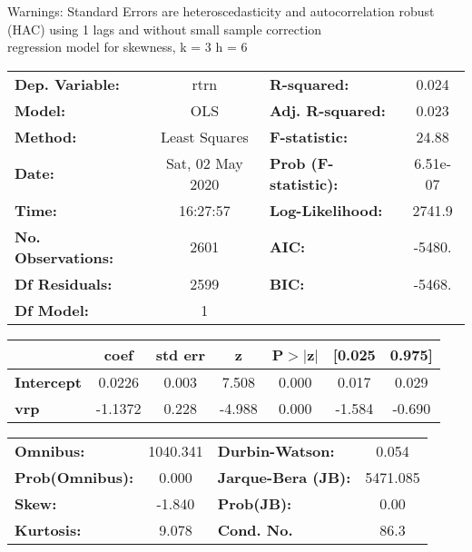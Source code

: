 Warnings: \newline
 [1] Standard Errors are heteroscedasticity and autocorrelation robust (HAC) using 1 lags and without small sample correction\\ 

regression model for skewness, k = 3 h = 6\begin{center}
\begin{tabular}{lclc}
\toprule
\textbf{Dep. Variable:}    &       rtrn       & \textbf{  R-squared:         } &     0.024   \\
\textbf{Model:}            &       OLS        & \textbf{  Adj. R-squared:    } &     0.023   \\
\textbf{Method:}           &  Least Squares   & \textbf{  F-statistic:       } &     24.88   \\
\textbf{Date:}             & Sat, 02 May 2020 & \textbf{  Prob (F-statistic):} &  6.51e-07   \\
\textbf{Time:}             &     16:27:57     & \textbf{  Log-Likelihood:    } &    2741.9   \\
\textbf{No. Observations:} &        2601      & \textbf{  AIC:               } &    -5480.   \\
\textbf{Df Residuals:}     &        2599      & \textbf{  BIC:               } &    -5468.   \\
\textbf{Df Model:}         &           1      & \textbf{                     } &             \\
\bottomrule
\end{tabular}
\begin{tabular}{lcccccc}
                   & \textbf{coef} & \textbf{std err} & \textbf{z} & \textbf{P$> |$z$|$} & \textbf{[0.025} & \textbf{0.975]}  \\
\midrule
\textbf{Intercept} &       0.0226  &        0.003     &     7.508  &         0.000        &        0.017    &        0.029     \\
\textbf{vrp}       &      -1.1372  &        0.228     &    -4.988  &         0.000        &       -1.584    &       -0.690     \\
\bottomrule
\end{tabular}
\begin{tabular}{lclc}
\textbf{Omnibus:}       & 1040.341 & \textbf{  Durbin-Watson:     } &    0.054  \\
\textbf{Prob(Omnibus):} &   0.000  & \textbf{  Jarque-Bera (JB):  } & 5471.085  \\
\textbf{Skew:}          &  -1.840  & \textbf{  Prob(JB):          } &     0.00  \\
\textbf{Kurtosis:}      &   9.078  & \textbf{  Cond. No.          } &     86.3  \\
\bottomrule
\end{tabular}
\end{center}

